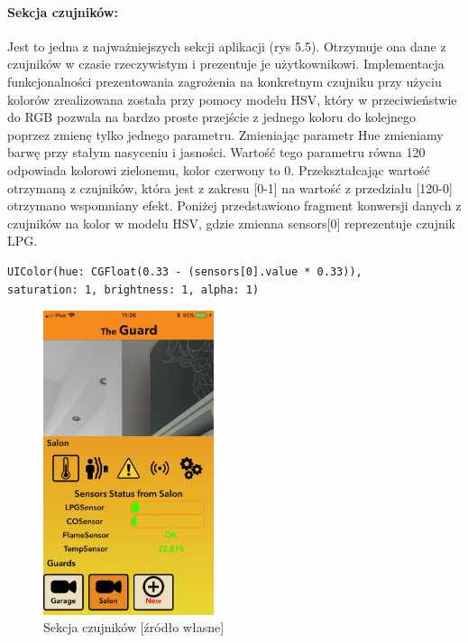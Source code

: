 \paragraph{Sekcja czujników:}
Jest to jedna z najważniejszych sekcji aplikacji (rys 5.5).  Otrzymuje ona dane z czujników w czasie rzeczywistym i prezentuje je użytkownikowi. Implementacja funkcjonalności prezentowania zagrożenia na konkretnym czujniku przy użyciu kolorów zrealizowana została przy pomocy modelu HSV, który w przeciwieństwie do RGB pozwala na bardzo proste przejście z jednego koloru do kolejnego poprzez zmienę tylko jednego parametru. Zmieniając parametr Hue zmieniamy barwę przy stałym nasyceniu i jasności. Wartość tego parametru równa 120\textdegree{} odpowiada kolorowi zielonemu, kolor czerwony to 0\textdegree{}. Przekształcając wartość otrzymaną z czujników, która jest z zakresu [0-1] na wartość z przedziału [120-0] otrzymano wspomniany efekt. 
Poniżej przedstawiono fragment konwersji danych z czujników na kolor w modelu HSV, gdzie zmienna sensors[0] reprezentuje czujnik LPG.
\begin{verbatim}
UIColor(hue: CGFloat(0.33 - (sensors[0].value * 0.33)),
saturation: 1, brightness: 1, alpha: 1)
\end{verbatim}
\begin{figure}[ht]
	\centering
	\includegraphics[width=5cm]{ios_screenshots/sensors.png}
	\caption{Sekcja czujników [źródło własne]}
\end{figure}
